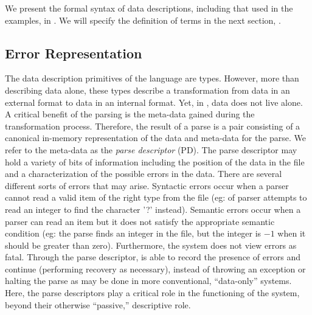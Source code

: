 We present the formal syntax of data descriptions, including that used
in the examples, in . We will specify the
definition of terms  in the next section, .

\subsection{Error Representation}

The data description primitives of the \pads{} language are types.
However, more than describing data alone, these types describe a
transformation from data in an external format to data in an internal
format.  Yet, in \pads{}, data does not live alone. A critical benefit
of the parsing is the meta-data gained during the transformation
process.  Therefore, the result of a parse is a pair consisting of a
canonical in-memory representation of the data and meta-data for the
parse.  We refer to the meta-data as the {\em parse descriptor} (PD).
The parse descriptor may hold a variety of bits of information
including the position of the data in the file and a characterization
of the possible errors in the data.  There are several different sorts
of errors that may arise.  Syntactic errors occur when a parser cannot
read a valid item of the right type from the file (eg: of parser
attempts to read an integer to find the character '?'  instead).
Semantic errors occur when a parser can read an item but it does not
satisfy the appropriate semantic condition (eg: the parse finds an
integer in the file, but the integer is $-1$ when it should be greater
than zero).  Furthermore, the \pads{} system does not view errors as
fatal. Through the parse descriptor, \pads{} is able to record the
presence of errors and continue (performing recovery as necessary),
instead of throwing an exception or halting the parse as may be done
in more conventional, ``data-only'' systems. Here, the parse
descriptors play a critical role in the functioning of the system,
beyond their otherwise ``passive,'' descriptive role.

